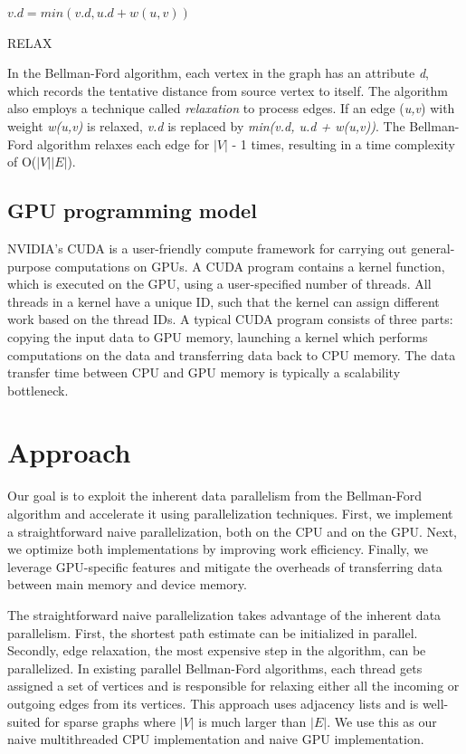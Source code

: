 \documentclass[twocolumn]{article}
\begin{document}
\begin{algorithm}
\SetAlgoLined
$v.d = min(v.d, u.d + w(u, v))$\;
\caption{RELAX}
\end{algorithm}
In the Bellman-Ford algorithm, each vertex in the graph has an attribute \emph{d}, which records the tentative distance from source vertex to itself. The algorithm also employs a technique called \emph{relaxation} to process edges. If an edge (\emph{u,v}) with weight \emph{w(u,v)} is relaxed, \emph{v.d} is replaced by \emph{min(v.d, u.d + w(u,v))}. The Bellman-Ford algorithm relaxes each edge for $\left|V\right|$ - 1 times, resulting in a time complexity of O($\left|V\right|$$\left|E\right|$).

\subsection{GPU programming model}

NVIDIA's CUDA is a user-friendly compute framework for carrying out general-purpose computations on GPUs\cite{nvi}. A CUDA program contains a kernel function, which is executed on the GPU, using a user-specified number of threads. All threads in a kernel have a unique ID, such that the kernel can assign different work based on the thread IDs. A typical CUDA program consists of three parts: copying the input data to GPU memory, launching a kernel which performs computations on the data and transferring data back to CPU memory. The data transfer time between CPU and GPU memory is typically a scalability bottleneck.


\section{Approach}
Our goal is to exploit the inherent data parallelism from the Bellman-Ford algorithm and accelerate it using parallelization techniques. First, we implement a straightforward naive parallelization, both on the CPU and on the GPU. Next, we optimize both implementations by improving work efficiency. Finally, we leverage GPU-specific features and mitigate the overheads of transferring data between main memory and device memory.

The straightforward naive parallelization takes advantage of the inherent data parallelism. First, the shortest path estimate can be initialized in parallel. Secondly, edge relaxation, the most expensive step in the algorithm, can be parallelized. In existing parallel Bellman-Ford algorithms, each thread gets assigned a set of vertices and is responsible for relaxing either all the incoming or outgoing edges from its vertices\cite{Busato2016AnEI}\cite{Harish2007}. This approach uses adjacency lists and is well-suited for sparse graphs where $|V|$ is much larger than $|E|$. We use this as our naive multithreaded CPU implementation and naive GPU implementation. 
\end{document}
